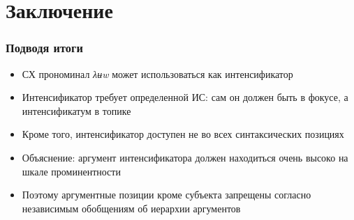 \documentclass{beamer}
\begin{document}

    

\section{Заключение}

\begin{frame}
    \frametitle{Подводя итоги}

    \begin{itemize}
        \item СХ прономинал \textit{λʉw} может использоваться как интенсификатор
        \item Интенсификатор требует определенной ИС: сам он должен быть в фокусе, а интенсификатум в топике
        \item Кроме того, интенсификатор доступен не во всех синтаксических позициях
        \pause
        \item Объяснение: аргумент интенсификатора должен находиться очень высоко на шкале проминентности
        \item Поэтому аргументные позиции кроме субъекта запрещены согласно независимым обобщениям об иерархии аргументов
        
    \end{itemize}

\end{frame}
\end{document}
